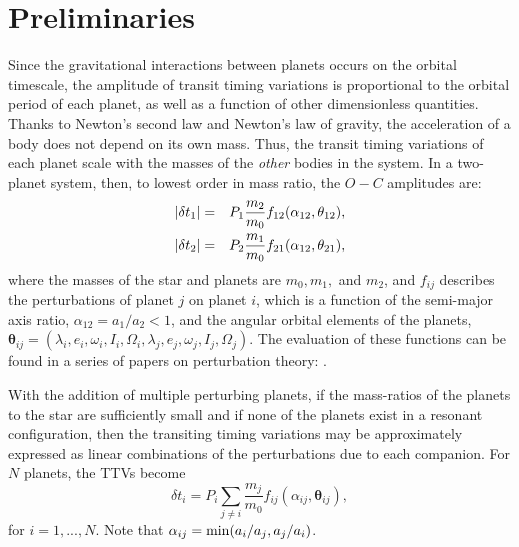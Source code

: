 \documentclass[graybox,natbib,nosecnum]{svmult}
\begin{document}
\section{Preliminaries}

Since the gravitational interactions between planets occurs on the orbital timescale, the
amplitude of transit timing variations is proportional to the orbital period of each planet,
as well as a function of other dimensionless quantities.  Thanks to Newton's second law
and Newton's law of gravity, the acceleration of a body does not depend on its own mass.
Thus, the transit timing variations of each planet scale with the masses of the {\it other} bodies
in the system.
In a two-planet system, then, to lowest order in mass ratio, the $O-C$ amplitudes are: 
\begin{eqnarray}
\vert \delta t_1\vert &=& P_1 \frac{m_2}{m_0} f_{12}(\alpha_{12},\mathbf{\theta}_{12}),\cr
\vert \delta t_2\vert &=& P_2 \frac{m_1}{m_0} f_{21}(\alpha_{12},\mathbf{\theta}_{21}),
\end{eqnarray}
where the masses of the star and planets are $m_0, m_1,$ and $m_2$, and $f_{ij}$ describes the perturbations of planet $j$ on planet $i$,
which is a function of the semi-major axis ratio, $\alpha_{12}= a_1/a_2 < 1$, and the angular orbital 
elements of the planets, $\mathbf{\theta}_{ij} = (\lambda_i,e_i,\omega_i,I_i,\Omega_i,\lambda_j,e_j,\omega_j,I_j,\Omega_j)$.  The evaluation of these functions can be found in a series of papers on perturbation theory: \cite{2008ApJ...688..636N, 2009ApJ...701.1116N,2010ApJ...709L..44N,2016ApJ...818..177A,2016ApJ...821...96D}.

With the addition of multiple perturbing planets, if the mass-ratios of the planets to the star are
sufficiently small and if none of the planets exist in a resonant configuration, then the transiting timing 
variations may be approximately expressed as linear combinations of the perturbations due to each companion.
For $N$ planets, the TTVs become
\begin{equation}
\delta t_i = P_i \sum_{j \ne i}  \frac{m_j}{m_0} f_{ij}(\alpha_{ij},\mathbf{\theta}_{ij}),
\end{equation}
for $i=1,...,N$.
Note that $\alpha_{ij} = {\rm min}(a_i/a_j,a_j/a_i)$.
\end{document}
